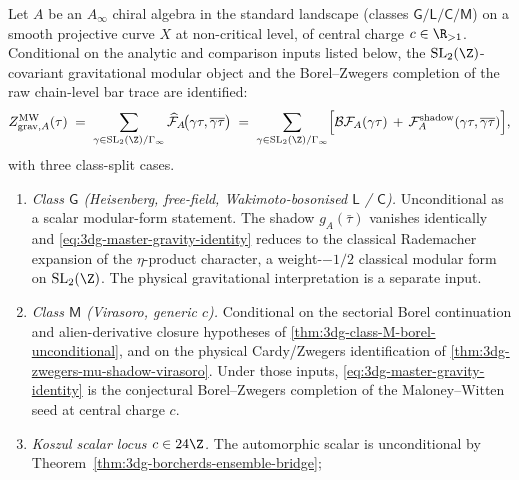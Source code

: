 \begin{conjecture}\label{thm:3dg-master-gravity}%
%
%
%
%
Let $A$ be an $A_{\infty}$ chiral algebra in the standard landscape
(classes $\mathsf G/\mathsf L/\mathsf C/\mathsf M$) on a smooth
projective curve $X$ at non-critical level, of central charge
$c \in \R_{> 1}$. Conditional on the analytic and comparison inputs
listed below, the $\mathrm{SL}_{2}(\Z)$-covariant gravitational
modular object and the Borel--Zwegers completion of the raw
chain-level bar trace are identified:
\begin{equation}\label{eq:3dg-master-gravity-identity}
 Z^{\mathrm{MW}}_{\mathrm{grav}, A}(\tau)
 \;=\;
 \sum_{\gamma \in \mathrm{SL}_{2}(\Z)/\Gamma_{\infty}}
 \widehat{\mathcal F}_{A}\!\bigl(\gamma\tau, \overline{\gamma\tau}\bigr)
 \;=\;
 \sum_{\gamma \in \mathrm{SL}_{2}(\Z)/\Gamma_{\infty}}
 \Bigl[
 \mathcal B\mathcal F_{A}(\gamma\tau)
 \,+\,
 \mathcal F^{\mathrm{shadow}}_{A}(\gamma\tau, \overline{\gamma\tau})
 \Bigr],
\end{equation}
with three class-split cases.
\begin{enumerate}[label=\textup{(\Alph*)}]
\item \emph{Class $\mathsf G$ \textup{(Heisenberg, free-field,
Wakimoto-bosonised
$\mathsf L$ / $\mathsf C$).}} Unconditional as a scalar modular-form
statement. The shadow
$g_{A}(\bar\tau)$ vanishes identically and
\eqref{eq:3dg-master-gravity-identity} reduces to the classical
Rademacher expansion of the $\eta$-product character,
a weight-$-1/2$ classical modular form on
$\mathrm{SL}_{2}(\Z)$. The physical gravitational interpretation is a
separate input.
\item \emph{Class $\mathsf M$ \textup{(Virasoro, generic $c$).}}
Conditional on the sectorial Borel continuation and
alien-derivative closure hypotheses of
\autoref{thm:3dg-class-M-borel-unconditional}, and on the physical
Cardy/Zwegers identification of
\autoref{thm:3dg-zwegers-mu-shadow-virasoro}. Under those inputs,
\eqref{eq:3dg-master-gravity-identity} is the conjectural
Borel--Zwegers completion of the Maloney--Witten
\cite{MaloneyWitten2007} seed at central charge \(c\).
\item \emph{Koszul scalar locus \(c\in 24\Z\).} The automorphic
scalar is unconditional by Theorem~\ref{thm:3dg-borcherds-ensemble-bridge};

\end{enumerate}
\end{conjecture}
